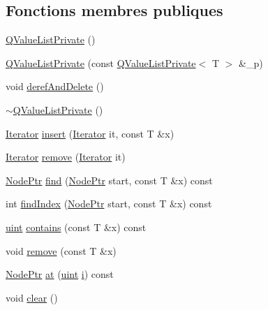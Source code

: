 \subsection*{Fonctions membres publiques}
\begin{DoxyCompactItemize}
\item 
\hyperlink{class_q_value_list_private_a4bc6b1cd9fef45a3d1915efcc871d908}{Q\+Value\+List\+Private} ()
\item 
\hyperlink{class_q_value_list_private_ad8a661568ebec3ed2f94b5c70c8400c1}{Q\+Value\+List\+Private} (const \hyperlink{class_q_value_list_private}{Q\+Value\+List\+Private}$<$ T $>$ \&\+\_\+p)
\item 
void \hyperlink{class_q_value_list_private_a4f5de8641a836057ec25301cd6937379}{deref\+And\+Delete} ()
\item 
\hyperlink{class_q_value_list_private_a2355389b4e0eb80db28a0324abfd8180}{$\sim$\+Q\+Value\+List\+Private} ()
\item 
\hyperlink{class_q_value_list_private_aef9e14569c19defeaa2b6c8e636fafde}{Iterator} \hyperlink{class_q_value_list_private_a17ef275bde3ca8dddb1a180d2f492990}{insert} (\hyperlink{class_q_value_list_private_aef9e14569c19defeaa2b6c8e636fafde}{Iterator} it, const T \&x)
\item 
\hyperlink{class_q_value_list_private_aef9e14569c19defeaa2b6c8e636fafde}{Iterator} \hyperlink{class_q_value_list_private_ad8c240552b9a418f7cd604e19cbb4917}{remove} (\hyperlink{class_q_value_list_private_aef9e14569c19defeaa2b6c8e636fafde}{Iterator} it)
\item 
\hyperlink{class_q_value_list_private_a63f9e5099e8c8445e00af7e3f4d7e274}{Node\+Ptr} \hyperlink{class_q_value_list_private_abf5166c81a4b504e68e666d2fb57f4b2}{find} (\hyperlink{class_q_value_list_private_a63f9e5099e8c8445e00af7e3f4d7e274}{Node\+Ptr} start, const T \&x) const 
\item 
int \hyperlink{class_q_value_list_private_a0e7311e11d119baec26985d18ce6c828}{find\+Index} (\hyperlink{class_q_value_list_private_a63f9e5099e8c8445e00af7e3f4d7e274}{Node\+Ptr} start, const T \&x) const 
\item 
\hyperlink{qglobal_8h_a4d3943ddea65db7163a58e6c7e8df95a}{uint} \hyperlink{class_q_value_list_private_a0286e5169776749feefb4d67ccce96bd}{contains} (const T \&x) const 
\item 
void \hyperlink{class_q_value_list_private_aeec88498050bea418f0d2f35fa9e7f9f}{remove} (const T \&x)
\item 
\hyperlink{class_q_value_list_private_a63f9e5099e8c8445e00af7e3f4d7e274}{Node\+Ptr} \hyperlink{class_q_value_list_private_a04ad86f51c7c09407e762dbeb707af16}{at} (\hyperlink{qglobal_8h_a4d3943ddea65db7163a58e6c7e8df95a}{uint} \hyperlink{060__command__switch_8tcl_a8c90afd4641b25be86bd09983c3cbee0}{i}) const 
\item 
void \hyperlink{class_q_value_list_private_a4d3b3bceb36ae04887b37545929ddbdd}{clear} ()
\end{DoxyCompactItemize}
